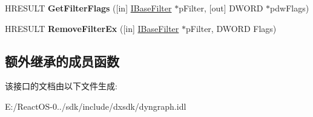 \begin{DoxyCompactItemize}
\item 
\mbox{\label{interface_i_graph_config_a9fcadce1181fd59311c5c1349dd1684a}} 
H\+R\+E\+S\+U\+LT {\bfseries Get\+Filter\+Flags} (\mbox{[}in\mbox{]} \hyperlink{interface_i_base_filter}{I\+Base\+Filter} $\ast$p\+Filter, \mbox{[}out\mbox{]} D\+W\+O\+RD $\ast$pdw\+Flags)
\item 
\mbox{\label{interface_i_graph_config_a4cf4e7e83398f3ca827fa720ae43ee3a}} 
H\+R\+E\+S\+U\+LT {\bfseries Remove\+Filter\+Ex} (\mbox{[}in\mbox{]} \hyperlink{interface_i_base_filter}{I\+Base\+Filter} $\ast$p\+Filter, D\+W\+O\+RD Flags)
\end{DoxyCompactItemize}
\subsection*{额外继承的成员函数}


该接口的文档由以下文件生成\+:\begin{DoxyCompactItemize}
\item 
E\+:/\+React\+O\+S-\/0../sdk/include/dxsdk/dyngraph.\+idl\end{DoxyCompactItemize}
